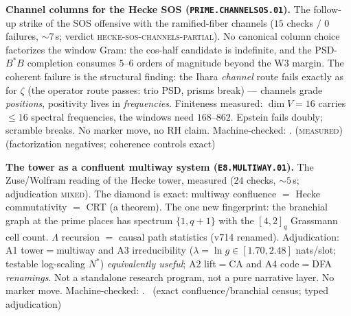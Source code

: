 \par\smallskip\noindent\textbf{Channel columns for the Hecke SOS
(\texttt{PRIME.CHANNELSOS.01}).}
The follow-up strike of the SOS offensive with the ramified-fiber
channels ($15$ checks $/$ $0$ failures, ${\sim}7$\,s; verdict
\textsc{hecke-sos-channels-partial}).  No canonical column choice
factorizes the window Gram: the cos-half candidate is indefinite,
and the PSD-$B^*B$ completion consumes $5$--$6$ orders of magnitude
beyond the W3 margin.  The coherent failure is the structural
finding: the Ihara \emph{channel} route fails exactly as for
$\zeta$ (the operator route passes: trio PSD, prisms break) ---
channels grade \emph{positions}, positivity lives in
\emph{frequencies}.  Finiteness measured: $\dim V=16$ carries
$\le16$ spectral frequencies, the windows need $168$--$862$.
Epstein fails doubly; scramble breaks.  No marker move, no RH
claim.
Machine-checked: .
(\textsc{measured}) (factorization negatives; coherence controls
exact)
\par\smallskip


\par\smallskip\noindent\textbf{The tower as a confluent multiway
system (\texttt{E8.MULTIWAY.01}).}
The Zuse/Wolfram reading of the Hecke tower, measured ($24$ checks,
${\sim}5$\,s; adjudication \textsc{mixed}).  The diamond is exact:
multiway confluence $=$ Hecke commutativity $=$ CRT (a theorem).
The one new fingerprint: the branchial graph at the prime places
has spectrum $\{1,q{+}1\}$ with the $[4,2]_q$ Grassmann cell count.
$\Lambda$ recursion $=$ causal path statistics (v714 renamed).
Adjudication: A1 tower$=$multiway and A3 irreducibility
($\lambda=\ln g\in[1.70,2.48]$ nats/slot; testable log-scaling
$N^*$) \emph{equivalently useful}; A2 lift$=$CA and A4 code$=$DFA
\emph{renamings}.  Not a standalone research program, not a pure
narrative layer.  No marker move.
Machine-checked: .
\mE\ (exact confluence/branchial census; typed adjudication)
\par\smallskip


